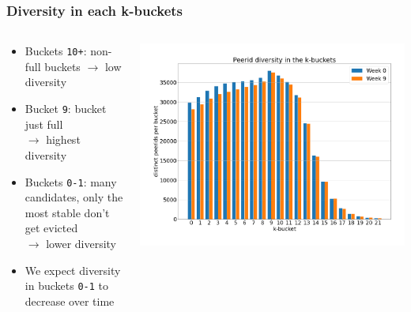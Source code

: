 \documentclass{pl-slide}
\begin{document}
\begin{frame}
\frametitle{Diversity in each k-buckets}

\begin{columns}[onlytextwidth]
\begin{column}{0.38\textwidth}
   \begin{itemize}
   		\item Buckets \texttt{10+}: non-full buckets $\rightarrow$ low diversity
   		\item Bucket \texttt{9}: bucket just full \\$\rightarrow$ highest diversity
   		\item Buckets \texttt{0-1}: many candidates, only the most stable don't get evicted \\$\rightarrow$ lower diversity
   		\item We expect diversity in buckets \texttt{0-1} to decrease over time
   \end{itemize}
\end{column}
\begin{column}{0.58\textwidth}
    \begin{center}
		\includegraphics[width=\textwidth]{plots/diversity-in-buckets.png}
    \end{center}
\end{column}
\end{columns}
\end{frame}
\end{document}
